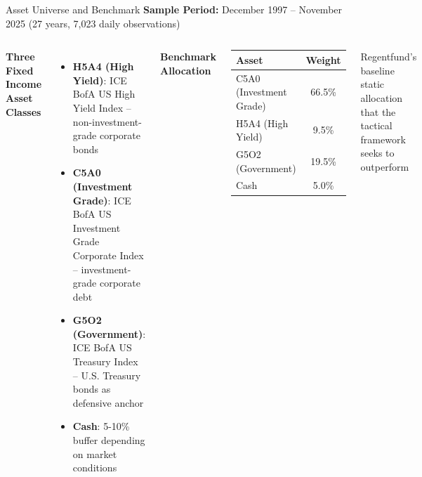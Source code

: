 \documentclass[aspectratio=169,10pt]{beamer}
\begin{document}
\begin{frame}{Asset Universe and Benchmark}
\textbf{Sample Period:} December 1997 -- November 2025 (27 years, 7,023 daily observations)

\vspace{0.3cm}

\begin{columns}[t]
\textbf{Three Fixed Income Asset Classes}
\begin{itemize}
    \item \textbf{H5A4 (High Yield)}: ICE BofA US High Yield Index -- non-investment-grade corporate bonds

    \item \textbf{C5A0 (Investment Grade)}: ICE BofA US Investment Grade Corporate Index -- investment-grade corporate debt

    \item \textbf{G5O2 (Government)}: ICE BofA US Treasury Index -- U.S. Treasury bonds as defensive anchor

    \item \textbf{Cash}: 5-10\% buffer depending on market conditions
\end{itemize}

\textbf{Benchmark Allocation}
\begin{center}
\begin{tabular}{lc}
\toprule
\textbf{Asset} & \textbf{Weight} \\
\midrule
C5A0 (Investment Grade) & 66.5\% \\
H5A4 (High Yield) & 9.5\% \\
G5O2 (Government) & 19.5\% \\
Cash & 5.0\% \\
\bottomrule
\end{tabular}
\end{center}

\vspace{0.2cm}

Regentfund's baseline static allocation that the tactical framework seeks to outperform
\end{columns}
\end{frame}
\end{document}
